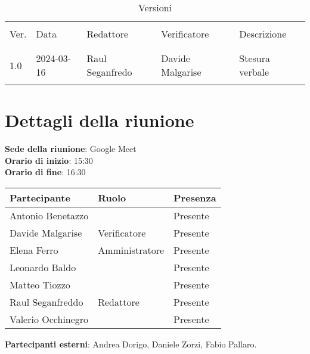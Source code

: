 \documentclass[italian,12pt]{article}
\begin{document}


\newpage



\begin{table}[!h]
	\caption{Versioni}
	\footnotesize
	\begin{center}
		\begin{tabular}{ l l l l p{6cm} }
			\hline                                                                              \\[-2ex]
			Ver. & Data       & Redattore          & Verificatore       & Descrizione           \\
			\\[-2ex] \hline \\[-1.5ex]
			1.0  & 2024-03-16 & Raul Seganfredo    & Davide Malgarise & Stesura verbale \\
			\\[-1.5ex] \hline
		\end{tabular}
	\end{center}
\end{table}

\newpage

\tableofcontents

\newpage

\section{Dettagli della riunione}


\textbf{Sede della riunione}: Google Meet\\
\textbf{Orario di inizio}: 15:30\\
\textbf{Orario di fine}: 16:30\\

\begin{flushleft}
	\begin{table}[!h]
	\begin{tabular}{ |l|l|l| } 
		\hline
		\textbf{Partecipante} & \textbf{Ruolo}       & \textbf{Presenza} \\
		\hline 
		Antonio Benetazzo     &                      & Presente          \\
		Davide Malgarise      & Verificatore         & Presente          \\
		Elena Ferro           & Amministratore       & Presente          \\
		Leonardo Baldo        &                      & Presente          \\
		Matteo Tiozzo         &                      & Presente          \\
		Raul Seganfreddo      & Redattore			 & Presente          \\
		Valerio Occhinegro    &                      & Presente          \\
		\hline
	\end{tabular}
	\end{table}
	\textbf{Partecipanti esterni}: Andrea Dorigo, Daniele Zorzi, Fabio Pallaro.\\
\end{flushleft}
\end{document}
